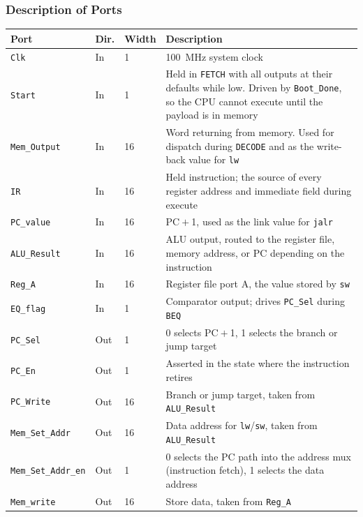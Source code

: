 \documentclass[11pt,letterpaper]{article}
\begin{document}
\subsubsection{Description of Ports}
\begin{table}[H]
  \centering
  \small
  \begin{tabular}{@{}lllp{}@{}}
    \toprule
    \textbf{Port} & \textbf{Dir.} & \textbf{Width} & \textbf{Description} \\
    \midrule
    \texttt{Clk}             & In  & 1  & 100~MHz system clock \\
    \texttt{Start}           & In  & 1  & Held in \texttt{FETCH} with all outputs at their defaults while low. Driven by \texttt{Boot\_Done}, so the CPU cannot execute until the payload is in memory \\
    \texttt{Mem\_Output}     & In  & 16 & Word returning from memory. Used for dispatch during \texttt{DECODE} and as the write-back value for \texttt{lw} \\
    \texttt{IR}              & In  & 16 & Held instruction; the source of every register address and immediate field during execute \\
    \texttt{PC\_value}       & In  & 16 & PC${}+{}$1, used as the link value for \texttt{jalr} \\
    \texttt{ALU\_Result}     & In  & 16 & ALU output, routed to the register file, memory address, or PC depending on the instruction \\
    \texttt{Reg\_A}          & In  & 16 & Register file port A, the value stored by \texttt{sw} \\
    \texttt{EQ\_flag}        & In  & 1  & Comparator output; drives \texttt{PC\_Sel} during \texttt{BEQ} \\
    \midrule
    \texttt{PC\_Sel}         & Out & 1  & 0 selects PC${}+{}$1, 1 selects the branch or jump target \\
    \texttt{PC\_En}          & Out & 1  & Asserted in the state where the instruction retires \\
    \texttt{PC\_Write}       & Out & 16 & Branch or jump target, taken from \texttt{ALU\_Result} \\
    \texttt{Mem\_Set\_Addr}  & Out & 16 & Data address for \texttt{lw}/\texttt{sw}, taken from \texttt{ALU\_Result} \\
    \texttt{Mem\_Set\_Addr\_en} & Out & 1 & 0 selects the PC path into the address mux (instruction fetch), 1 selects the data address \\
    \texttt{Mem\_write}      & Out & 16 & Store data, taken from \texttt{Reg\_A} \\

\end{tabular}
\end{table}
\end{document}
